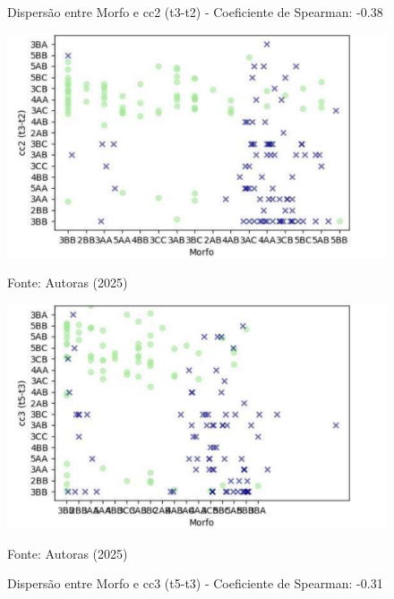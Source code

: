 \begin{figure}[h]
    \captionsetup{font=footnotesize, justification=centering, labelsep=period, position=above}
    \centering
    \begin{minipage}[b]{0.45\linewidth}
        \caption{Dispersão entre Morfo e cc2 (t3-t2) - Coeficiente de Spearman: -0.38}
        \label{fig:morfo-cc2}
        \centering
        \includegraphics[scale=0.35]{figuras/Spearman/morfo-cc2.pdf}
        \vspace{0.3cm}
        \begin{minipage}{\linewidth}
            \centering
            \scriptsize{Fonte: Autoras (2025)}
        \end{minipage}
    \end{minipage}
    \hspace{0.05\linewidth}
    \begin{minipage}[b]{0.45\linewidth}
        \caption{Dispersão entre Morfo e cc3 (t5-t3) - Coeficiente de Spearman: -0.31}
        \label{fig:morfo-cc3}
        \centering
        \includegraphics[scale=0.35]{figuras/Spearman/morfo-cc3.pdf}
        \vspace{0.3cm}
        \begin{minipage}{\linewidth}
            \centering
            \scriptsize{Fonte: Autoras (2025)}
        \end{minipage}
    \end{minipage}
\end{figure}
\FloatBarrier


